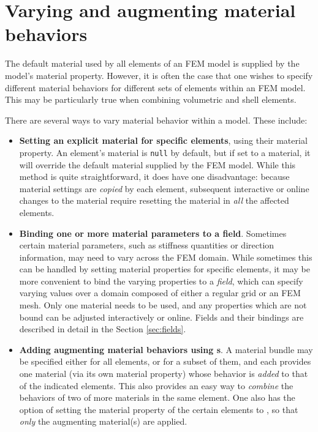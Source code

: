 \section{Varying and augmenting material behaviors}
\label{sec:augmentingMaterials}

The default material used by all elements of an FEM model is supplied
by the model's {\sf material} property.  However, it is often the case
that one wishes to specify different material behaviors for
different sets of elements within an FEM model. This may be
particularly true when combining volumetric and shell elements.

There are several ways to vary material behavior within a model.
These include:

\begin{itemize}

\item {\bf Setting an explicit material for specific elements}, using
their {\sf material} property.  An element's material is {\tt null} by
default, but if set to a material, it will override the
default material supplied by the FEM model. While this method is quite
straightforward, it does have one disadvantage: because material
settings are {\it copied} by each element, subsequent interactive or
online changes to the material require resetting the material in {\it all}
the affected elements.

\item {\bf Binding one or more material parameters to a field}.
Sometimes certain material parameters, such as stiffness quantities or
direction information, may need to vary across the FEM domain.  While
sometimes this can be handled by setting material properties for
specific elements, it may be more convenient to bind the varying
properties to a {\it field}, which can specify varying values over a
domain composed of either a regular grid or an FEM mesh.  Only one
material needs to be used, and any properties which are not bound can
be adjusted interactively or online. Fields and their bindings are
described in detail in the Section \ref{sec:fields}.

\item {\bf Adding augmenting material behaviors using 
s}.  A material
bundle may be specified either for all elements, or for a subset of
them, and each provides one material (via its own {\sf material}
property) whose behavior is {\it added} to that of the indicated
elements. This also provides an easy way to {\it combine} the
behaviors of two of more materials in the same element.  One also has
the option of setting the {\sf material} property of the certain
elements to , so
that {\it only} the augmenting material(s) are applied.


\end{itemize}
